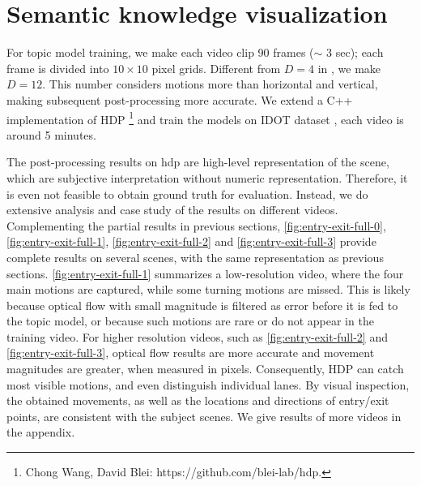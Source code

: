 \section{Semantic knowledge visualization}
\label{sec:hdp-res}

For topic model training, we make each video clip 90 frames ($\sim$ 3 sec); each frame is divided into $10\times10$ pixel grids. Different from $D=4$ in \cite{wang2009unsupervised,kuettel2010s}, we make $D=12$. This number considers motions more than horizontal and vertical, making subsequent post-processing more accurate. 
We extend a C++ implementation of HDP \footnote{Chong Wang, David Blei: https://github.com/blei-lab/hdp.} and train the models on IDOT dataset \cite{yanziVehicleTracker}, each video is around 5 minutes. 

The post-processing results on \gls{hdp} are high-level representation of the scene, which are subjective interpretation without numeric representation.
Therefore, it is even not feasible to obtain ground truth for evaluation.
Instead, we do extensive analysis and case study of the results on different videos.
Complementing the partial results in previous sections, \ref{fig:entry-exit-full-0}, \ref{fig:entry-exit-full-1}, \ref{fig:entry-exit-full-2} and \ref{fig:entry-exit-full-3} provide complete results on several scenes, 
with the same representation as previous sections.
\ref{fig:entry-exit-full-1} summarizes a low-resolution video, where the four main motions are captured, while some turning motions are missed. 
This is likely because optical flow with small magnitude is filtered as error before it is fed to the topic model, or because such motions are rare or do not appear in the training video.
For higher resolution videos, such as \ref{fig:entry-exit-full-2} and \ref{fig:entry-exit-full-3}, optical flow results are more accurate and movement magnitudes are greater, when measured in pixels. 
Consequently, HDP can catch most visible motions, and even distinguish individual lanes.
By visual inspection, the obtained movements, as well as the locations and directions of entry/exit points, are consistent with the subject scenes. 
We give results of more videos in the appendix.
